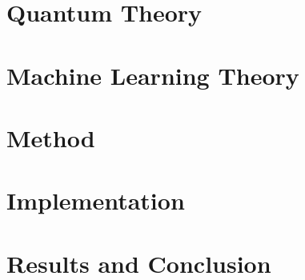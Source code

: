 \documentclass[english]{uiofysmaster}
\begin{document}
	
    
    
    
    \part{Quantum Theory}
    
    
    
    
    \part{Machine Learning Theory}
    
    
    
    \part{Method}
    
    
    \part{Implementation}
    
    
    
    
    \part{Results and Conclusion}
    
    
    
    \appendix
    
    
    
    
    \newpage
    \nocite{*}
    \printbibliography
\end{document}
